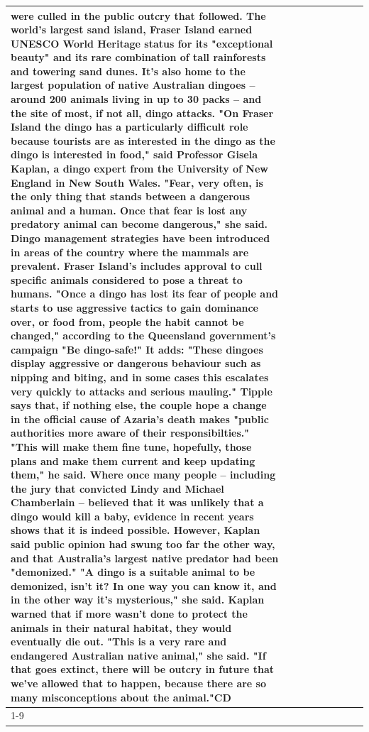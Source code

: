 \begin{table}[H]
\begin{tabular}{lllrlllll}
were culled in the public outcry that followed. The world's largest sand island, Fraser Island earned UNESCO World Heritage status for its "exceptional beauty" and its rare combination of tall rainforests and towering sand dunes. It's also home to the largest population of native Australian dingoes -- around 200 animals living in up to 30 packs -- and the site of most, if not all, dingo attacks. "On Fraser Island the dingo has a particularly difficult role because tourists are as interested in the dingo as the dingo is interested in food," said Professor Gisela Kaplan, a dingo expert from the University of New England in New South Wales. "Fear, very often, is the only thing that stands between a dangerous animal and a human. Once that fear is lost any predatory animal can become dangerous," she said. Dingo management strategies have been introduced in areas of the country where the mammals are prevalent. Fraser Island's includes approval to cull specific animals considered to pose a threat to humans. "Once a dingo has lost its fear of people and starts to use aggressive tactics to gain dominance over, or food from, people the habit cannot be changed," according to the Queensland government's campaign "Be dingo-safe!" It adds: "These dingoes display aggressive or dangerous behaviour such as nipping and biting, and in some cases this escalates very quickly to attacks and serious mauling." Tipple says that, if nothing else, the couple hope a change in the official cause of Azaria's death makes "public authorities more aware of their responsibilties." "This will make them fine tune, hopefully, those plans and make them current and keep updating them," he said. Where once many people -- including the jury that convicted Lindy and Michael Chamberlain -- believed that it was unlikely that a dingo would kill a baby, evidence in recent years shows that it is indeed possible. However, Kaplan said public opinion had swung too far the other way, and that Australia's largest native predator had been "demonized." "A dingo is a suitable animal to be demonized, isn't it? In one way you can know it, and in the other way it's mysterious," she said. Kaplan warned that if more wasn't done to protect the animals in their natural habitat, they would eventually die out. "This is a very rare and endangered Australian native animal," she said. "If that goes extinct, there will be outcry in future that we've allowed that to happen, because there are so many misconceptions about the animal."CD \\
\cline{1-9}

\end{tabular}
\end{table}
